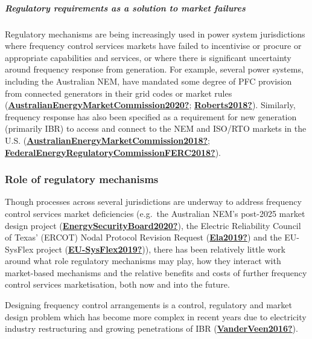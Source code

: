 \documentclass[12pt,a4paper,]{report}
\begin{document}
\hypertarget{regulatory-requirements-as-a-solution-to-market-failures}{%
\subparagraph{Regulatory requirements as a solution to market
failures}\label{regulatory-requirements-as-a-solution-to-market-failures}}

Regulatory mechanisms are being increasingly used in power system
jurisdictions where frequency control services markets have failed to
incentivise or procure or appropriate capabilities and services, or
where there is significant uncertainty around frequency response from
generation. For example, several power systems, including the Australian
NEM, have mandated some degree of PFC provision from connected
generators in their grid codes or market rules
(\protect\hyperlink{ref-AustralianEnergyMarketCommission2020}{\textbf{AustralianEnergyMarketCommission2020?}};
\protect\hyperlink{ref-Roberts2018}{\textbf{Roberts2018?}}). Similarly,
frequency response has also been specified as a requirement for new
generation (primarily IBR) to access and connect to the NEM and ISO/RTO
markets in the U.S.
(\protect\hyperlink{ref-AustralianEnergyMarketCommission2018}{\textbf{AustralianEnergyMarketCommission2018?}};
\protect\hyperlink{ref-FederalEnergyRegulatoryCommissionFERC2018}{\textbf{FederalEnergyRegulatoryCommissionFERC2018?}}).

\hypertarget{role-of-regulatory-mechanisms}{%
\subsubsection{Role of regulatory
mechanisms}\label{role-of-regulatory-mechanisms}}

Though processes across several jurisdictions are underway to address
frequency control services market deficiencies (e.g.~the Australian
NEM's post-2025 market design project
(\protect\hyperlink{ref-EnergySecurityBoard2020}{\textbf{EnergySecurityBoard2020?}}),
the Electric Reliability Council of Texas' (ERCOT) Nodal Protocol
Revision Request (\protect\hyperlink{ref-Ela2019}{\textbf{Ela2019?}})
and the EU-SysFlex project
(\protect\hyperlink{ref-EU-SysFlex2019}{\textbf{EU-SysFlex2019?}})),
there has been relatively little work around what role regulatory
mechanisms may play, how they interact with market-based mechanisms and
the relative benefits and costs of further frequency control services
marketisation, both now and into the future.

Designing frequency control arrangements is a control, regulatory and
market design problem which has become more complex in recent years due
to electricity industry restructuring and growing penetrations of IBR
(\protect\hyperlink{ref-VanderVeen2016}{\textbf{VanderVeen2016?}}).
\end{document}
